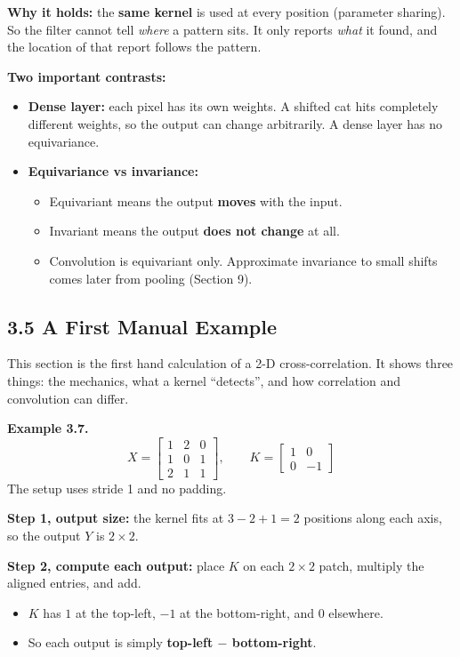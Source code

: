 \textbf{Why it holds:} the \textbf{same kernel} is used at every position (parameter sharing). So the filter cannot tell \emph{where} a pattern sits. It only reports \emph{what} it found, and the location of that report follows the pattern.

\textbf{Two important contrasts:}
\begin{itemize}
  \item \textbf{Dense layer:} each pixel has its own weights. A shifted cat hits completely different weights, so the output can change arbitrarily. A dense layer has no equivariance.
  \item \textbf{Equivariance vs invariance:}
  \begin{itemize}
    \item Equivariant means the output \textbf{moves} with the input.
    \item Invariant means the output \textbf{does not change} at all.
    \item Convolution is equivariant only. Approximate invariance to small shifts comes later from pooling (Section 9).
  \end{itemize}
\end{itemize}


\subsection*{3.5 A First Manual Example}

This section is the first hand calculation of a 2-D cross-correlation. It shows three things: the mechanics, what a kernel ``detects'', and how correlation and convolution can differ.

\textbf{Example 3.7.}
\[
X = \begin{bmatrix} 1 & 2 & 0 \\ 1 & 0 & 1 \\ 2 & 1 & 1 \end{bmatrix},
\qquad
K = \begin{bmatrix} 1 & 0 \\ 0 & -1 \end{bmatrix}
\]
The setup uses stride 1 and no padding.

\textbf{Step 1, output size:} the kernel fits at $3 - 2 + 1 = 2$ positions along each axis, so the output $Y$ is $2 \times 2$.

\textbf{Step 2, compute each output:} place $K$ on each $2 \times 2$ patch, multiply the aligned entries, and add.
\begin{itemize}
  \item $K$ has $1$ at the top-left, $-1$ at the bottom-right, and $0$ elsewhere.
  \item So each output is simply \textbf{top-left $-$ bottom-right}.
\end{itemize}

